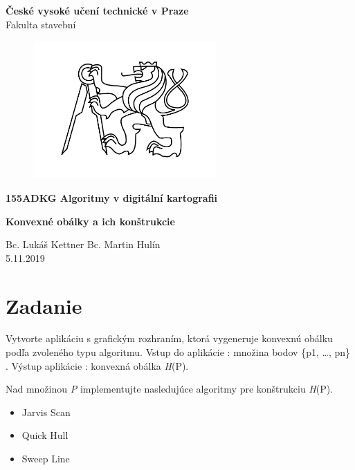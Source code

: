 \documentclass[12pt]{article}
\begin{document}
\begin{titlepage}
\centering
\Large \textbf{České vysoké učení technické v Praze }\\ Fakulta stavební
\vspace{2cm}

\begin{figure}[h!] %
\centering
\includegraphics[width=7cm]{./img/cvut.png}
\end{figure}
 
\Large \textbf{155ADKG Algoritmy v digitální kartografii}
\vspace{1cm}

\LARGE  \textbf{ Konvexné obálky a ich konštrukcie}
\vspace{3cm}

\Large Bc. Lukáš Kettner Bc. Martin Hulín \\ 5.11.2019

 \thispagestyle{empty} %
\end{titlepage}

\tableofcontents    %
\newpage %
\section{Zadanie}
Vytvorte aplikáciu s grafickým rozhraním, ktorá vygeneruje konvexnú obálku podľa zvoleného typu algoritmu. Vstup do aplikácie : množina bodov  \{p1, …, pn\} . Výstup aplikácie : konvexná obálka  \textit{H}(P).

Nad množinou   \textit{P} implementujte nasledujúce algoritmy pre konštrukciu \textit{H}(P).

\begin{itemize}
\item Jarvis Scan
\item Quick Hull
\item Sweep Line
\end{itemize}
		
\end{document}

